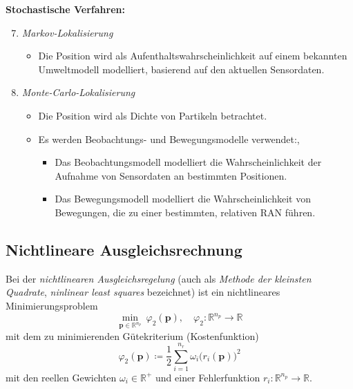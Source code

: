 \documentclass[a4paper, 11pt, accentcolor = tud3b]{tudreport}
\newcommand{\R}{\mathbb{R}}
\renewcommand{\vec}[1]{\boldsymbol{\mathbf{#1}}}
\begin{document}
			\textbf{Stochastische Verfahren:}
			\begin{enumerate} \setcounter{enumi}{6}
				\item \emph{Markov-Lokalisierung}
					\begin{itemize}
						\item Die Position wird als Aufenthaltswahrscheinlichkeit auf einem bekannten Umweltmodell modelliert, basierend auf den aktuellen Sensordaten.
					\end{itemize}
				\item \emph{Monte-Carlo-Lokalisierung}
					\begin{itemize}
						\item Die Position wird als Dichte von Partikeln betrachtet.
						\item Es werden Beobachtungs- und Bewegungsmodelle verwendet:, 
							\begin{itemize}
								\item Das Beobachtungsmodell modelliert die Wahrscheinlichkeit der Aufnahme von Sensordaten an bestimmten Positionen.
								\item Das Bewegungsmodell modelliert die Wahrscheinlichkeit von Bewegungen, die zu einer bestimmten, relativen RAN führen.
							\end{itemize}
					\end{itemize}
			\end{enumerate}
		
			\subsection{Nichtlineare Ausgleichsrechnung}
				\label{sec:least_squares}
			
				Bei der \emph{nichtlinearen Ausgleichsregelung} (auch als \emph{Methode der kleinsten Quadrate}, \emph{ninlinear least squares} bezeichnet) ist ein nichtlineares Minimierungsproblem
				\begin{equation*}
					\min_{\vec{p} \in \R^{n_p}} \> \varphi_2(\vec{p}),\quad \varphi_2 : \R^{n_p} \to \R
				\end{equation*}
				mit dem zu minimierenden Gütekriterium (Kostenfunktion)
				\begin{equation*}
					\varphi_2(\vec{p}) \coloneqq \frac{1}{2} \sum_{i = 1}^{n_r} \omega_i \big(r_i(\vec{p})\big)^2
				\end{equation*}
				mit den reellen Gewichten \( \omega_i \in \R^+ \) und einer Fehlerfunktion \( r_i : \R^{n_p} \to \R \).
				
\end{document}

